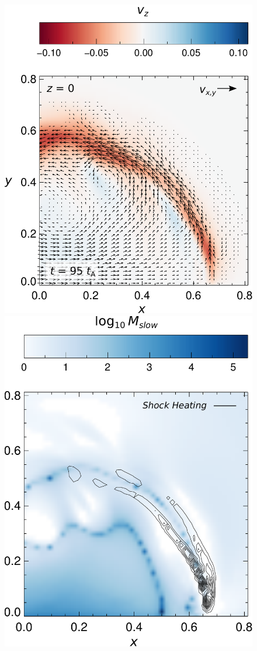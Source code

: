 \documentclass{./packages/rs/rsproca}
\begin{document}
\begin{figure}[h!]
  \center  
  \includegraphics[scale=0.35]{./inkscape/256x256x512/vz_sca_v_vec}
  \includegraphics[scale=0.35]{./inkscape/256x256x512/slow_mach_sca_visc_con}

\end{figure}
\end{document}
